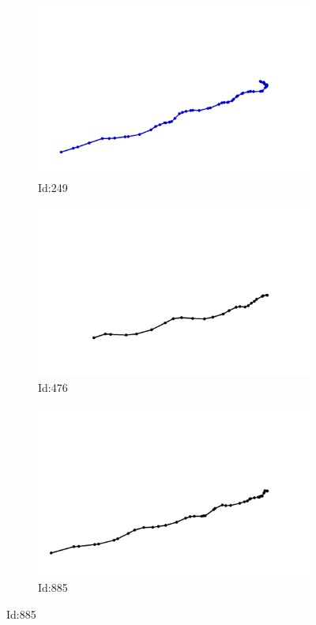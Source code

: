 \documentclass[12pt,twoside]{report}
\begin{document}
\begin{figure}
\centering
\begin{subfigure}[b]{0.20\textwidth}
\centering
\includegraphics[width=\textwidth]{../../trajectories/249.png}
\caption{Id:249}
\end{subfigure}
\begin{subfigure}[b]{0.20\textwidth}
\centering
\includegraphics[width=\textwidth]{../../trajectories/476.png}
\caption{Id:476}
\end{subfigure}
\begin{subfigure}[b]{0.20\textwidth}
\centering
\includegraphics[width=\textwidth]{../../trajectories/885.png}
\caption{Id:885}
\end{subfigure}
\end{figure}
\end{document}
